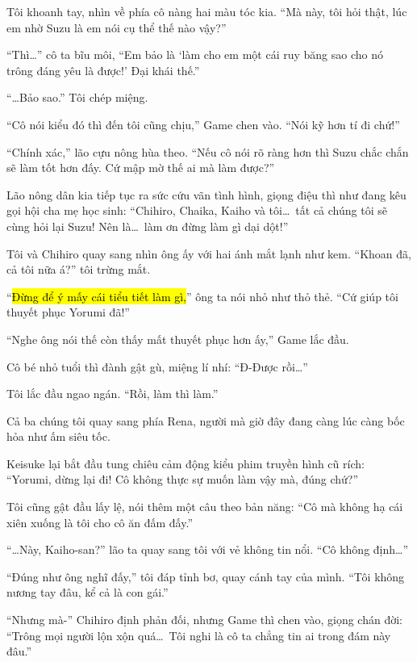 \documentclass[../main.tex]{subfiles}
\begin{document}
Tôi khoanh tay, nhìn về phía cô nàng hai màu tóc  kia. ``Mà này, tôi hỏi thật, lúc em nhờ Suzu là em nói cụ thể thế nào vậy?''

``Thì\dots'' cô ta bĩu môi, ``Em bảo là `làm cho em một cái ruy băng sao cho nó trông đáng yêu là được!' Đại khái thế.''

``\dots Bảo sao.'' Tôi chép miệng.

``Cô nói kiểu đó thì đến tôi cũng chịu,'' Game chen vào. ``Nói kỹ hơn tí đi chứ!''

``Chính xác,'' lão cựu nông hùa theo. ``Nếu cô nói rõ ràng hơn thì Suzu chắc chắn sẽ làm tốt hơn đấy. Cứ mập mờ thế ai mà làm được?''

Lão nông dân kia tiếp tục ra sức cứu vãn tình hình, giọng điệu thì như đang kêu gọi hội cha mẹ học sinh: ``Chihiro, Chaika, Kaiho và tôi\dots\ tất cả chúng tôi sẽ cùng hỏi lại Suzu! Nên là\dots\ làm ơn đừng làm gì dại dột!''

Tôi và Chihiro quay sang nhìn ông ấy với hai ánh mắt lạnh như kem. ``Khoan đã, cả tôi nữa á?'' tôi trừng mắt.

``\hl{Đừng để ý mấy cái tiểu tiết làm gì,}'' ông ta nói nhỏ như thỏ thẻ. ``Cứ giúp tôi thuyết phục Yorumi đã!''


``Nghe ông nói thế còn thấy mất thuyết phục hơn ấy,'' Game lắc đầu.

Cô bé nhỏ tuổi thì đành gật gù, miệng lí nhí: ``Đ-Được rồi\dots''

Tôi lắc đầu ngao ngán. ``Rồi, làm thì làm.''

Cả ba chúng tôi quay sang phía Rena, người mà giờ đây đang càng lúc càng bốc hỏa như ấm siêu tốc.

Keisuke lại bắt đầu tung chiêu cảm động kiểu phim truyền hình cũ rích: ``Yorumi, dừng lại đi! Cô không thực sự muốn làm vậy mà, đúng chứ?''

Tôi cũng gật đầu lấy lệ, nói thêm một câu theo bản năng: ``Cô mà không hạ cái xiên xuống là tôi cho cô ăn đấm đấy.''

``\dots Này, Kaiho-san?'' lão ta quay sang tôi với vẻ không tin nổi. ``Cô không định\dots''

``Đúng như ông nghĩ đấy,'' tôi đáp tỉnh bơ, quay cánh tay của mình. ``Tôi không nương tay đâu, kể cả là con gái.''

``Nhưng mà-'' Chihiro định phản đối, nhưng Game thì chen vào, giọng chán đời: ``Trông mọi người lộn xộn quá\dots\ Tôi nghi là cô ta chẳng tin ai trong đám này đâu.''
\end{document}
